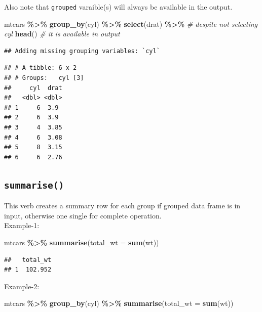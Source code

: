 \documentclass[
]{book}
\newenvironment{Shaded}{\begin{snugshade}}{\end{snugshade}}
\newcommand{\AttributeTok}[1]{\textcolor[rgb]{0.13,0.29,0.53}{#1}}
\newcommand{\CommentTok}[1]{\textcolor[rgb]{0.56,0.35,0.01}{\textit{#1}}}
\newcommand{\FunctionTok}[1]{\textcolor[rgb]{0.13,0.29,0.53}{\textbf{#1}}}
\newcommand{\NormalTok}[1]{#1}
\newcommand{\SpecialCharTok}[1]{\textcolor[rgb]{0.81,0.36,0.00}{\textbf{#1}}}
\begin{document}
Also note that \texttt{grouped} varaible(s) will always be available in the output.

\begin{Shaded}
\begin{Highlighting}[]
\NormalTok{mtcars }\SpecialCharTok{\%\textgreater{}\%} 
  \FunctionTok{group\_by}\NormalTok{(cyl) }\SpecialCharTok{\%\textgreater{}\%} 
  \FunctionTok{select}\NormalTok{(drat) }\SpecialCharTok{\%\textgreater{}\%} \CommentTok{\# despite not selecting cyl}
  \FunctionTok{head}\NormalTok{() }\CommentTok{\# it is available in output}
\end{Highlighting}
\end{Shaded}

\begin{verbatim}
## Adding missing grouping variables: `cyl`
\end{verbatim}

\begin{verbatim}
## # A tibble: 6 x 2
## # Groups:   cyl [3]
##     cyl  drat
##   <dbl> <dbl>
## 1     6  3.9 
## 2     6  3.9 
## 3     4  3.85
## 4     6  3.08
## 5     8  3.15
## 6     6  2.76
\end{verbatim}

\hypertarget{summarise}{%
\subsection{\texorpdfstring{\texttt{summarise()}}{summarise()}}\label{summarise}}

This verb creates a summary row for each group if grouped data frame is in input, otherwise one single for complete operation.\\
Example-1:

\begin{Shaded}
\begin{Highlighting}[]
\NormalTok{mtcars }\SpecialCharTok{\%\textgreater{}\%} 
  \FunctionTok{summarise}\NormalTok{(}\AttributeTok{total\_wt =} \FunctionTok{sum}\NormalTok{(wt))}
\end{Highlighting}
\end{Shaded}

\begin{verbatim}
##   total_wt
## 1  102.952
\end{verbatim}

Example-2:

\begin{Shaded}
\begin{Highlighting}[]
\NormalTok{mtcars }\SpecialCharTok{\%\textgreater{}\%} 
  \FunctionTok{group\_by}\NormalTok{(cyl) }\SpecialCharTok{\%\textgreater{}\%} 
  \FunctionTok{summarise}\NormalTok{(}\AttributeTok{total\_wt =} \FunctionTok{sum}\NormalTok{(wt))}
\end{Highlighting}
\end{Shaded}
\end{document}
